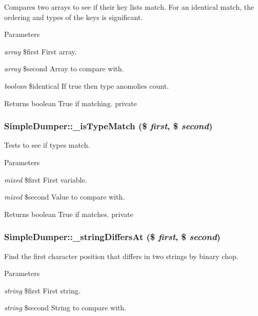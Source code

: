 \label{class_simple_dumper_ac0da3bfc6ffa456da3d5aa360f70aed8}
Compares two arrays to see if their key lists match. For an identical match, the ordering and types of the keys is significant. 
\begin{DoxyParams}{Parameters}
\item[{\em array}]\$first First array. \item[{\em array}]\$second Array to compare with. \item[{\em boolean}]\$identical If true then type anomolies count. \end{DoxyParams}
\begin{DoxyReturn}{Returns}
boolean True if matching.  private 
\end{DoxyReturn}
\hypertarget{class_simple_dumper_a42de5f42d63586d40792e87e7089f76e}{
\subsubsection[{\_\-isTypeMatch}]{\setlength{\rightskip}{0pt plus 5cm}SimpleDumper::\_\-isTypeMatch (\$ {\em first}, \/  \$ {\em second})}}
\label{class_simple_dumper_a42de5f42d63586d40792e87e7089f76e}
Tests to see if types match. 
\begin{DoxyParams}{Parameters}
\item[{\em mixed}]\$first First variable. \item[{\em mixed}]\$second Value to compare with. \end{DoxyParams}
\begin{DoxyReturn}{Returns}
boolean True if matches.  private 
\end{DoxyReturn}
\hypertarget{class_simple_dumper_a64f96298601fcbfbf658b607096e8a73}{
\subsubsection[{\_\-stringDiffersAt}]{\setlength{\rightskip}{0pt plus 5cm}SimpleDumper::\_\-stringDiffersAt (\$ {\em first}, \/  \$ {\em second})}}
\label{class_simple_dumper_a64f96298601fcbfbf658b607096e8a73}
Find the first character position that differs in two strings by binary chop. 
\begin{DoxyParams}{Parameters}
\item[{\em string}]\$first First string. \item[{\em string}]\$second String to compare with. \end{DoxyParams}
